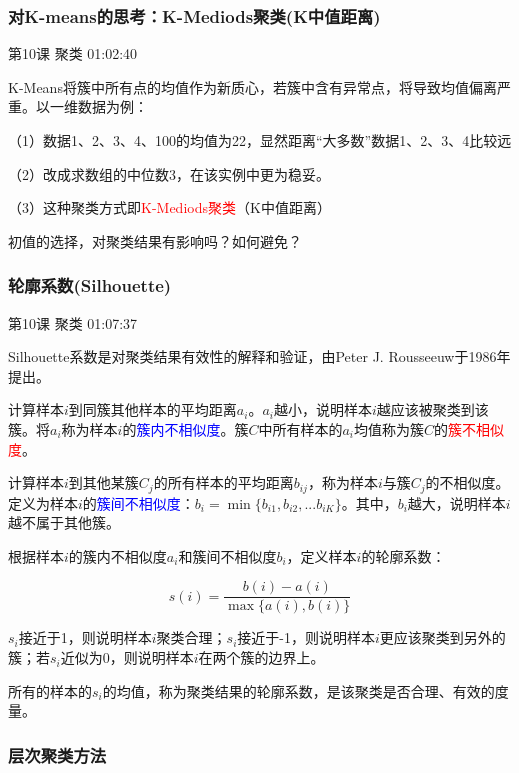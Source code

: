 \documentclass[UTF8]{ctexbook}
\begin{document}
\subsubsection{对K-means的思考：K-Mediods聚类(K中值距离)}

第10课 聚类 01:02:40

K-Means将簇中所有点的均值作为新质心，若簇中含有异常点，将导致均值偏离严重。以一维数据为例：

（1）数据1、2、3、4、100的均值为22，显然距离“大多数”数据1、2、3、4比较远

（2）改成求数组的中位数3，在该实例中更为稳妥。

（3）这种聚类方式即\textcolor{red}{K-Mediods聚类}（K中值距离）

初值的选择，对聚类结果有影响吗？如何避免？

\subsubsection{轮廓系数(Silhouette)}

第10课 聚类 01:07:37

Silhouette系数是对聚类结果有效性的解释和验证，由Peter J. Rousseeuw于1986年提出。

计算样本$i$到同簇其他样本的平均距离$a_{i}$。$a_{i}$越小，说明样本$i$越应该被聚类到该簇。将$a_{i}$称为样本$i$的\textcolor{blue}{簇内不相似度}。簇$C$中所有样本的$a_{i}$均值称为簇$C$的\textcolor{red}{簇不相似度}。

计算样本$i$到其他某簇$C_{j}$的所有样本的平均距离$b_{ij}$，称为样本$i$与簇$C_{j}$的不相似度。定义为样本$i$的\textcolor{blue}{簇间不相似度}：$b_{i}=\min \{ b_{i1},b_{i2},...b_{iK} \}$。其中，$b_{i}$越大，说明样本$i$越不属于其他簇。

根据样本$i$的簇内不相似度$a_{i}$和簇间不相似度$b_{i}$，定义样本$i$的轮廓系数：

\begin{displaymath}
s(i)=\frac{b(i)-a(i)}{\max \{ a(i),b(i)\}}
\end{displaymath}

$s_{i}$接近于1，则说明样本$i$聚类合理；$s_{i}$接近于-1，则说明样本$i$更应该聚类到另外的簇；若$s_{i}$近似为0，则说明样本$i$在两个簇的边界上。

所有的样本的$s_{i}$的均值，称为聚类结果的轮廓系数，是该聚类是否合理、有效的度量。

\subsubsection{层次聚类方法}
\end{document}
